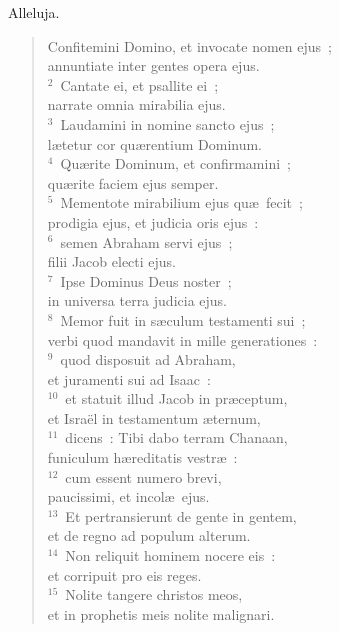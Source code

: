 \lettrine[lines=3,image=true,loversize=0.05,lraise=-0.03]{A}{}lleluja. \begin{flushleft}\begin{verse}\vspace{6pt}Confitemini Domino, et invocate nomen ejus~;\\ annuntiate inter gentes opera ejus.\\
${}^{2}$~Cantate ei, et psallite ei~;\\ narrate omnia mirabilia ejus.\\
${}^{3}$~Laudamini in nomine sancto ejus~;\\ l\ae tetur cor qu\ae rentium Dominum.\\
${}^{4}$~Qu\ae rite Dominum, et confirmamini~;\\ qu\ae rite faciem ejus semper.\\
${}^{5}$~Mementote mirabilium ejus qu\ae\ fecit~;\\ prodigia ejus, et judicia oris ejus~:\\
${}^{6}$~semen Abraham servi ejus~;\\ filii Jacob electi ejus.\\
${}^{7}$~Ipse Dominus Deus noster~;\\ in universa terra judicia ejus.\\
${}^{8}$~Memor fuit in s\ae culum testamenti sui~;\\ verbi quod mandavit in mille generationes~:\\
${}^{9}$~quod disposuit ad Abraham,\\ et juramenti sui ad Isaac~:\\
${}^{10}$~et statuit illud Jacob in pr\ae ceptum,\\ et Isra\"el in testamentum \ae ternum,\\
${}^{11}$~dicens~: Tibi dabo terram Chanaan,\\ funiculum h\ae reditatis vestr\ae~:\\
${}^{12}$~cum essent numero brevi,\\ paucissimi, et incol\ae\ ejus.\\
${}^{13}$~Et pertransierunt de gente in gentem,\\ et de regno ad populum alterum.\\
${}^{14}$~Non reliquit hominem nocere eis~:\\ et corripuit pro eis reges.\\
${}^{15}$~Nolite tangere christos meos,\\ et in prophetis meis nolite malignari.\\

\end{verse}
\end{flushleft}
